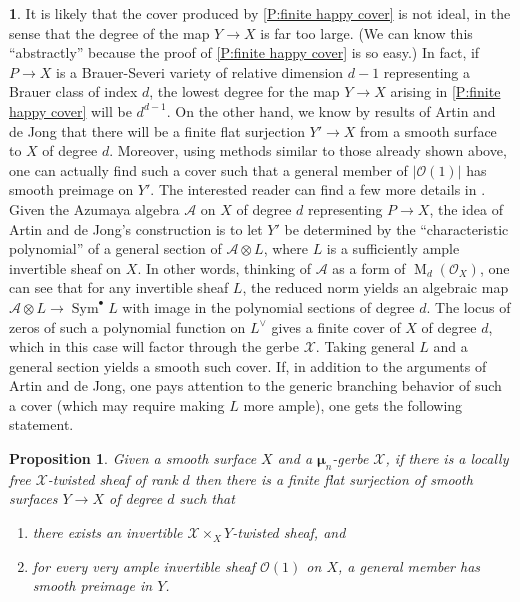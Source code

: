\documentclass[11pt]{amsart}
\newcommand{\ms}[1]{\mathscr #1}
\newcommand{\m}{\boldsymbol{\mu}}
\renewcommand{\[}{[\!\hspace{0.03em}[}
\renewcommand{\]}{]\!\hspace{0.03em}]}
\renewcommand{\(}{(\!\hspace{0.03em}(}
\renewcommand{\)}{)\!\hspace{0.03em})}
\DeclareMathOperator*{\tensor}{\otimes}
\DeclareMathOperator{\M}{\operatorname{M}}
\newtheorem{prop}[lem]{Proposition}
\theoremstyle{definition}
\newtheorem{para}[lem]{\indent}
\theoremstyle{remark}
\begin{document}
\begin{para}\label{R:smaller degree} It is likely that the cover produced by \ref{P:finite 
happy cover} is not ideal, in the sense that the degree of the map 
$Y\to X$ is far too large.  (We can know this ``abstractly'' because 
the proof of \ref{P:finite happy cover} is so easy.)  In fact, if $P\to X$ is a Brauer-Severi 
variety of relative dimension $d-1$ representing a Brauer class of 
index $d$, the lowest degree 
for the map $Y\to X$ arising in \ref{P:finite happy cover} will be $d^{d-1}$.  On the 
other hand, we know by results of Artin and de Jong 
\cite[\S8.1]{artin-dejong} that there will be 
a finite flat surjection $Y'\to X$ from a smooth surface to $X$ of 
degree $d$.  Moreover, using methods similar to those already shown 
above, one can actually find such a cover such that a general member 
of $|{\ms O}(1)|$ has smooth preimage on $Y'$.  The interested reader can 
find a few more details in \cite{period-index-paper}.  Given the Azumaya algebra $\ms A$ 
on $X$ of degree $d$ representing $P\to X$, the idea of Artin and de 
Jong's construction is to let $Y'$ be determined by the 
``characteristic polynomial'' of a general section of $\ms A\tensor 
L$, where $L$ is a sufficiently ample invertible sheaf on $X$.   In 
other words, thinking of $\ms A$ as a form of $\M_{d}({\ms O}_{X})$, one 
can see that for any invertible sheaf $L$, the reduced norm yields an 
algebraic map $\ms A\tensor L\to\operatorname{Sym}^{\bullet}L$ with 
image in the polynomial sections of degree $d$.  The locus of zeros 
of such a polynomial function on $L^{\vee}$ gives a finite cover of 
$X$ of degree $d$, which in this case will factor through the gerbe $\ms X$.  Taking 
general $L$ and a general section yields a smooth such cover.  If, in 
addition to the arguments of Artin and de Jong, one pays attention to 
the generic branching behavior of such a cover (which may require 
making $L$ more ample), one gets the following statement.
\end{para}

\begin{prop}\label{C:artin de jong cover} Given a smooth surface $X$ and a $\m_{n}$-gerbe $\ms X$, 
if there is a locally free $\ms X$-twisted sheaf of rank $d$ then 
there is a finite flat surjection of smooth surfaces $Y\to X$ of 
degree $d$ such that 
\begin{enumerate}
    \item there exists an invertible $\ms X\times_{X}Y$-twisted 
    sheaf, and

    \item for every very ample invertible sheaf ${\ms O}(1)$ on $X$, a general 
member has smooth preimage in $Y$. 
\end{enumerate}
\end{prop}
\end{document}
